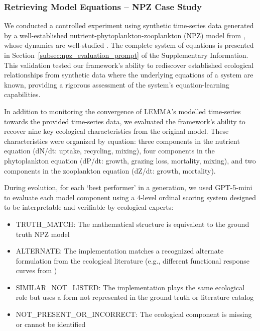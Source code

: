 \subsubsection{Retrieving Model Equations -- NPZ Case Study}

We conducted a controlled experiment using synthetic time-series data generated by a well-established nutrient-phytoplankton-zooplankton (NPZ) model from \cite{edwards1999zooplankton}, whose dynamics are well-studied \citep{boschetti2008mapping,boschetti2010detecting}. The complete system of equations is presented in Section~\ref{subsec:npz_evaluation_prompt} of the Supplementary Information. This validation tested our framework's ability to rediscover established ecological relationships from synthetic data where the underlying equations of a system are known, providing a rigorous assessment of the system's equation-learning capabilities.

In addition to monitoring the convergence of LEMMA's modelled time-series towards the provided time-series data, we evaluated the framework's ability to recover nine key ecological characteristics from the original model. These characteristics were organized by equation: three components in the nutrient equation (dN/dt: uptake, recycling, mixing), four components in the phytoplankton equation (dP/dt: growth, grazing loss, mortality, mixing), and two components in the zooplankton equation (dZ/dt: growth, mortality).

During evolution, for each `best performer' in a generation, we used GPT-5-mini to evaluate each model component using a 4-level ordinal scoring system designed to be interpretable and verifiable by ecological experts:

\begin{itemize}
    \item TRUTH\_MATCH: The mathematical structure is equivalent to the ground truth NPZ model
    \item ALTERNATE: The implementation matches a recognized alternate formulation from the ecological literature (e.g., different functional response curves from \citep{franks2002npz})
    \item SIMILAR\_NOT\_LISTED: The implementation plays the same ecological role but uses a form not represented in the ground truth or literature catalog
    \item NOT\_PRESENT\_OR\_INCORRECT: The ecological component is missing or cannot be identified
\end{itemize}

